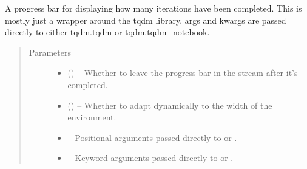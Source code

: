 \documentclass[letterpaper,10pt,english]{sphinxmanual}
\begin{document}
\begin{fulllineitems}
\label{\detokenize{xanespy:xanespy.utilities.prog}}
A progress bar for displaying how many iterations have been
completed. This is mostly just a wrapper around the tqdm
library. args and kwargs are passed directly to either
tqdm.tqdm or tqdm.tqdm\_notebook.
\begin{quote}\begin{description}
\item[{Parameters}] \leavevmode\begin{itemize}
\item {} 
 (\sphinxstyleliteralemphasis{, }) -- Whether to leave the progress bar in the stream after it's
completed.

\item {} 
 (\sphinxstyleliteralemphasis{, }) -- Whether to adapt dynamically to the width of the environment.

\item {} 
 -- Positional arguments passed directly to  or .

\item {} 
 -- Keyword arguments passed directly to  or .

\end{itemize}

\end{description}\end{quote}

\end{fulllineitems}

\end{document}
